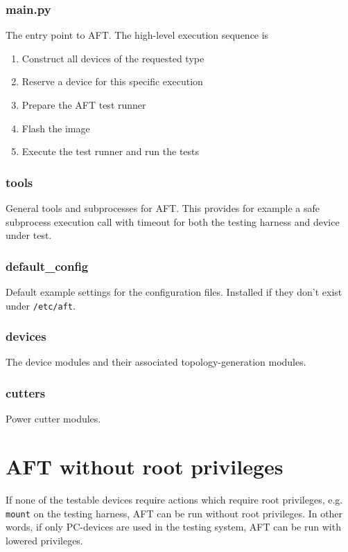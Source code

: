 \documentclass[a4paper,11pt]{article}
\newcommand{\cmd}[1]{\texttt{#1}}
\begin{document}
\subsubsection*{main.py}
The entry point to AFT. The high-level execution sequence is
\begin{enumerate}
\item Construct all devices of the requested type
\item Reserve a device for this specific execution
\item Prepare the AFT test runner
\item Flash the image
\item Execute the test runner and run the tests
\end{enumerate}

\subsubsection*{tools}
General tools and subprocesses for AFT. This provides for example a safe subprocess execution call with timeout for both the testing harness and device under test.

\subsubsection*{default\_config}
Default example settings for the configuration files. Installed if they don't exist under \cmd{/etc/aft}.

\subsubsection*{devices}
The device modules and their associated topology-generation modules.

\subsubsection*{cutters}
Power cutter modules.

\section{AFT without root privileges}
\label{app:noroot}

If none of the testable devices require actions which require root privileges, e.g. \cmd{mount} on the testing harness, AFT can be run without root privileges. In other words, if only PC-devices are used in the testing system, AFT can be run with lowered privileges.
\end{document}
